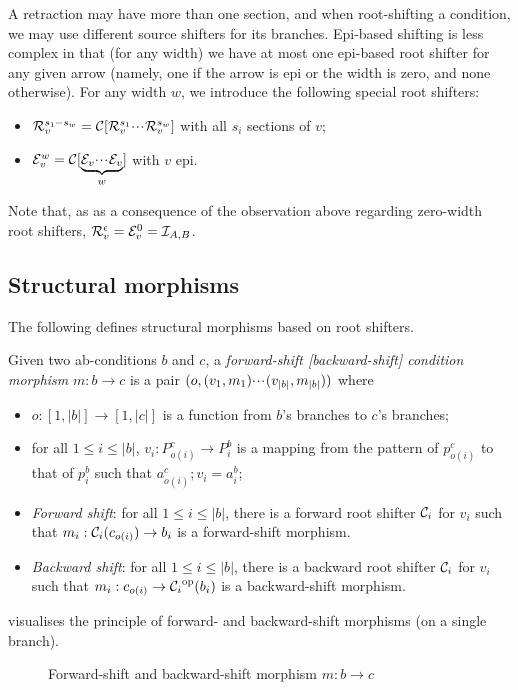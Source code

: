 A retraction may have more than one section, and when root-shifting a condition, we may use different source shifters for its branches. Epi-based shifting is less complex in that (for any width) we have at most one epi-based root shifter for any given arrow (namely, one if the arrow is epi or the width is zero, and none otherwise). For any width $w$, we introduce the following special root shifters:
\begin{itemize}
\item $\mathcal{R}_v^{s_1{\cdotp\mkern-2mu\cdotp\mkern-2mu\cdotp\mkern1mu} s_w} = \mathcal{C}[\mathcal{R}_v^{s_1}{\cdotp\mkern-2mu\cdotp\mkern-2mu\cdotp\mkern1mu} \mathcal{R}_v^{s_w}]$ with all $s_i$ sections of $v$;
\item $\mathcal{E}^w_v= \mathcal{C}[\underbrace{\mathcal{E}_v{\cdotp\mkern-2mu\cdotp\mkern-2mu\cdotp\mkern1mu}\mathcal{E}_v}_w]$ with $v$ epi.
\end{itemize}
%
Note that, as as a consequence of the observation above regarding zero-width root shifters, $\mathcal{R}_v^\epsilon=\mathcal{E}_v^0=\mathcal{I}_{A,B}$.

\subsection{Structural morphisms}

The following defines structural morphisms based on root shifters.

\begin{definition}
  Given two ab-conditions $b$ and $c$, a \emph{forward-shift [backward-shift] condition morphism} $m: b \to c$ is a pair $(o,(v_1,m_1){\cdotp\mkern-2mu\cdotp\mkern-2mu\cdotp\mkern1mu} (v_{|b|},m_{|b|}))$ where
  \begin{itemize}
  \item $o:[1,|b|]\to[1,|c|]$ is a function from $b$'s branches to $c$'s branches;
  \item for all $1\leq i\leq |b|$, $v_i:P^c_{o(i)}\to P^b_i$ is a mapping from the pattern of $p^c_{o(i)}$ to that of $p^b_i$ such that $a^c_{o(i)};v_i=a^b_i$;
  \item\emph{Forward shift}: for all $1\leq i\leq |b|$, there is a forward root shifter $\mathcal{C}_i$ for $v_i$ such that $m_i:{\mathcal{C}_i}(c_{o(i)})\to b_i$ is a forward-shift morphism.
  \item\emph{Backward shift}: for all $1\leq i\leq |b|$, there is a backward root shifter $\mathcal{C}_i$ for $v_i$ such that $m_i:c_{o(i)}\to {\mathcal{C}_i}^{\mathrm{op}}(b_i)$ is a backward-shift morphism.
  \end{itemize}
\end{definition}
%
 visualises the principle of forward- and backward-shift morphisms (on a single branch).
%
\begin{figure}
\centering

\caption{Forward-shift and backward-shift morphism $m:b\to c$}
\end{figure}

